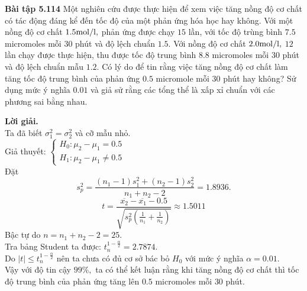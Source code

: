 \begin{mybox}
\textbf{Bài tập 5.114} Một nghiên cứu được thực hiện để xem việc tăng nồng độ cơ chất có tác động đáng kể đến tốc độ của một phản ứng hóa học hay không. Với một nồng độ cơ chất $1.5 \mathrm{{{mol} \mathord{\left/
 {\vphantom {{mol} l}} \right.
 \kern-\nulldelimiterspace} l}},$ phản ứng được chạy $15$ lần, với tốc độ trùng bình $7.5$ micromoles mỗi $30$ phút và độ lệch chuẩn $1.5.$ Với nồng độ cơ chất  $2.0 \mathrm{{{mol} \mathord{\left/
 {\vphantom {{mol} l}} \right.
 \kern-\nulldelimiterspace} l}},$ $12$ lần chạy được thực hiện, thu được tốc độ trung bình $8.8$ micromoles mỗi $30$ phút và độ lệch chuẩn mẫu $1.2.$ Có lý do để tin rằng việc tăng nồng độ cơ chất làm tăng tốc độ trung bình của phản ứng $0.5$ micromole mỗi $30$ phút hay không? Sử dụng mức ý nghĩa $0.01$ và giả sử rằng các tổng thể là xấp xỉ chuẩn với các phương sai bằng nhau.
\end{mybox}
\textbf{Lời giải.}\\
Ta đã biết $\sigma_1^2 = \sigma_2^2 $ và cỡ mẫu nhỏ.\\
Giả thuyết: $\begin{cases}
H_0: \mu_2 - \mu_1 = 0.5\\
H_1: \mu_2 - \mu_1 \ne 0.5
\end{cases}$\\
Đặt $$s_p^2 = \frac{{\left( {{n_1} - 1} \right)s_1^2 + \left( {{n_2} - 1} \right)s_2^2}}{{{n_1} + {n_2} - 2}} = 1.8936.$$
$$t = \frac{{\overline {{x_2}}  - \overline {{x_1}} } - 0.5}{{\sqrt {s_p^2\left( {\frac{1}{{{n_1}}} + \frac{1}{{{n_2}}}} \right)} }} \approx 1.5011$$
Bậc tự do $n = n_1 + n_2 - 2 = 25.$\\
Tra bảng Student ta được: $t_{n}^{1 - \frac{\alpha}{2}} = 2.7874.$\\
Do $\left| t \right| \leqslant t_{n}^{1 - \frac{\alpha}{2}}$ nên ta chưa có đủ cơ sở bác bỏ $H_0$ với mức ý nghĩa $\alpha = 0.01.$\\
Vậy với độ tin cậy $99\%,$ ta có thể kết luận rằng khi tăng nồng độ cơ chất thì tốc độ trung bình của phản ứng tăng lên $0.5$ micromoles mỗi $30$ phút.

